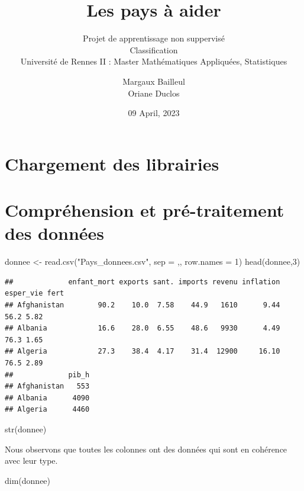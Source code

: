 \documentclass[
]{article}
\title{Les pays à aider}
\subtitle{Projet de apprentissage non suppervisé\\
Classification\\
Université de Rennes II : Master Mathématiques Appliquées, Statistiques}
\author{Margaux Bailleul\\
Oriane Duclos}
\date{09 April, 2023}
\newenvironment{Shaded}{}{}
\newcommand{\AttributeTok}[1]{#1}
\newcommand{\DecValTok}[1]{#1}
\newcommand{\FunctionTok}[1]{#1}
\newcommand{\NormalTok}[1]{#1}
\newcommand{\OtherTok}[1]{\textcolor[rgb]{1.00,0.25,0.00}{#1}}
\newcommand{\StringTok}[1]{\textcolor[rgb]{0.00,0.50,0.50}{#1}}
\begin{document}
\maketitle

{
\setcounter{tocdepth}{2}
\tableofcontents
}
\hypertarget{chargement-des-librairies}{%
\section{Chargement des librairies}\label{chargement-des-librairies}}

\hypertarget{compruxe9hension-et-pruxe9-traitement-des-donnuxe9es}{%
\section{Compréhension et pré-traitement des
données}\label{compruxe9hension-et-pruxe9-traitement-des-donnuxe9es}}

\begin{Shaded}
\begin{Highlighting}[]
\NormalTok{donnee }\OtherTok{\textless{}{-}} \FunctionTok{read.csv}\NormalTok{(}\StringTok{"Pays\_donnees.csv"}\NormalTok{, }\AttributeTok{sep =} \StringTok{\textquotesingle{},\textquotesingle{}}\NormalTok{, }\AttributeTok{row.names =} \DecValTok{1}\NormalTok{)}
\FunctionTok{head}\NormalTok{(donnee,}\DecValTok{3}\NormalTok{)}
\end{Highlighting}
\end{Shaded}

\begin{verbatim}
##             enfant_mort exports sant. imports revenu inflation esper_vie fert
## Afghanistan        90.2    10.0  7.58    44.9   1610      9.44      56.2 5.82
## Albania            16.6    28.0  6.55    48.6   9930      4.49      76.3 1.65
## Algeria            27.3    38.4  4.17    31.4  12900     16.10      76.5 2.89
##             pib_h
## Afghanistan   553
## Albania      4090
## Algeria      4460
\end{verbatim}

\begin{Shaded}
\begin{Highlighting}[]
\FunctionTok{str}\NormalTok{(donnee)}
\end{Highlighting}
\end{Shaded}

Nous observons que toutes les colonnes ont des données qui sont en
cohérence avec leur type.

\begin{Shaded}
\begin{Highlighting}[]
\FunctionTok{dim}\NormalTok{(donnee)}
\end{Highlighting}
\end{Shaded}
\end{document}
